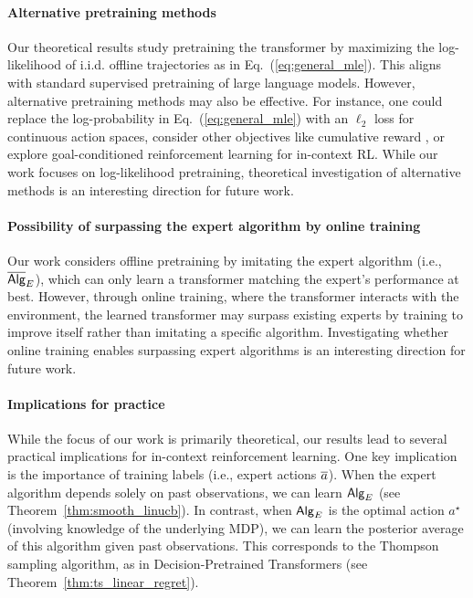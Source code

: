 \paragraph{Alternative pretraining methods} Our theoretical results study pretraining the transformer by maximizing the log-likelihood of i.i.d. offline trajectories as in Eq.~(\ref{eq:general_mle}). This aligns with standard supervised pretraining of large language models. However, alternative pretraining methods may also be effective. For instance, one could replace the log-probability in Eq.~(\ref{eq:general_mle}) with an $\ell_2$ loss for continuous action spaces, consider other objectives like cumulative reward \citep{duan2016rl}, or explore goal-conditioned reinforcement learning \citep{chen2021decision} for in-context RL. While our work focuses on log-likelihood pretraining, theoretical investigation of alternative methods is an interesting direction for future work.

\paragraph{Possibility of surpassing the expert algorithm by online training} Our work considers offline pretraining by imitating the expert algorithm (i.e., $\overline{\mathsf{Alg}}_{E}$), which can only learn a transformer matching the expert's performance at best. However, through online training, where the transformer interacts with the environment, the learned transformer may surpass existing experts by training to improve itself rather than imitating a specific algorithm. Investigating whether online training enables surpassing expert algorithms is an interesting direction for future work.





\paragraph{Implications for practice} While the focus of our work is primarily theoretical, our results lead to several practical implications for in-context reinforcement learning. One key implication is the importance of training labels (i.e., expert actions ${\overline{a}}$). When the expert algorithm depends solely on past observations, we can learn ${{\mathsf{Alg}}}_{{E}}$ (see Theorem~\ref{thm:smooth_linucb}). In contrast, when ${{\mathsf{Alg}}}_{{E}}$ is the optimal action $a^\star$ (involving knowledge of the underlying MDP), we can learn the posterior average of this algorithm given past observations. This corresponds to the Thompson sampling algorithm, as in Decision-Pretrained Transformers (see Theorem~\ref{thm:ts_linear_regret}).

